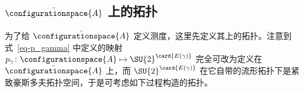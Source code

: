 
		\subsection{\texorpdfstring{$\bar{\configurationspace{A}}$ 上的拓扑}{量子位型空间上的拓扑}}

			为了给 $\bar{\configurationspace{A}}$ 定义测度，这里先定义其上的拓扑。注意到式~\eqref{eq-p_gamma} 中定义的映射 $p_\gamma \colon \configurationspace{A} \mapsto \SU{2}^{\card{E(\gamma)}}$ 完全可改为定义在 $\bar{\configurationspace{A}}$ 上，而 $\SU{2}^{\card{E(\gamma)}}$ 在它自带的流形拓扑下是紧致豪斯多夫拓扑空间，于是可考虑如下过程构造的拓扑\cite{Thiemann2007}。

